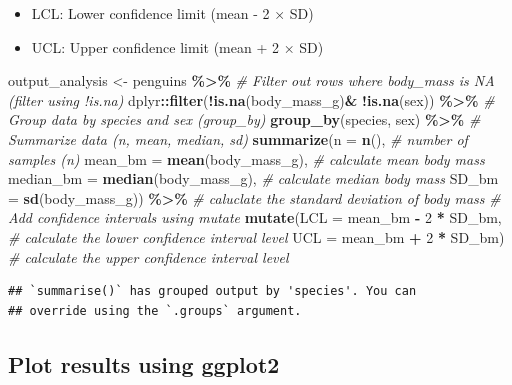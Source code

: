 \documentclass[
]{book}
\newenvironment{Shaded}{\begin{snugshade}}{\end{snugshade}}
\newcommand{\AttributeTok}[1]{\textcolor[rgb]{0.13,0.29,0.53}{#1}}
\newcommand{\CommentTok}[1]{\textcolor[rgb]{0.56,0.35,0.01}{\textit{#1}}}
\newcommand{\DecValTok}[1]{\textcolor[rgb]{0.00,0.00,0.81}{#1}}
\newcommand{\FunctionTok}[1]{\textcolor[rgb]{0.13,0.29,0.53}{\textbf{#1}}}
\newcommand{\NormalTok}[1]{#1}
\newcommand{\OtherTok}[1]{\textcolor[rgb]{0.56,0.35,0.01}{#1}}
\newcommand{\SpecialCharTok}[1]{\textcolor[rgb]{0.81,0.36,0.00}{\textbf{#1}}}
\providecommand{\tightlist}{%
  \setlength{\itemsep}{0pt}\setlength{\parskip}{0pt}}
\begin{document}
\begin{itemize}
\tightlist
\item
  LCL: Lower confidence limit (mean - 2 × SD)
\item
  UCL: Upper confidence limit (mean + 2 × SD)
\end{itemize}

\begin{Shaded}
\begin{Highlighting}[]
\NormalTok{output\_analysis }\OtherTok{\textless{}{-}}\NormalTok{ penguins }\SpecialCharTok{\%\textgreater{}\%}
  \CommentTok{\# Filter out rows where body\_mass is NA (filter using !is.na)}
\NormalTok{  dplyr}\SpecialCharTok{::}\FunctionTok{filter}\NormalTok{(}\SpecialCharTok{!}\FunctionTok{is.na}\NormalTok{(body\_mass\_g)}\SpecialCharTok{\&} \SpecialCharTok{!}\FunctionTok{is.na}\NormalTok{(sex)) }\SpecialCharTok{\%\textgreater{}\%}
  \CommentTok{\# Group data by species and sex (group\_by)}
  \FunctionTok{group\_by}\NormalTok{(species, sex) }\SpecialCharTok{\%\textgreater{}\%}
  \CommentTok{\# Summarize data (n, mean, median, sd)}
  \FunctionTok{summarize}\NormalTok{(}\AttributeTok{n =} \FunctionTok{n}\NormalTok{(), }\CommentTok{\# number of samples (n)}
            \AttributeTok{mean\_bm =} \FunctionTok{mean}\NormalTok{(body\_mass\_g), }\CommentTok{\# calculate mean body mass}
            \AttributeTok{median\_bm =} \FunctionTok{median}\NormalTok{(body\_mass\_g), }\CommentTok{\# calculate median body mass}
            \AttributeTok{SD\_bm =} \FunctionTok{sd}\NormalTok{(body\_mass\_g)) }\SpecialCharTok{\%\textgreater{}\%} \CommentTok{\# caluclate the standard deviation of body mass}
  \CommentTok{\# Add confidence intervals using mutate}
  \FunctionTok{mutate}\NormalTok{(}\AttributeTok{LCL =}\NormalTok{ mean\_bm }\SpecialCharTok{{-}} \DecValTok{2} \SpecialCharTok{*}\NormalTok{ SD\_bm, }\CommentTok{\# calculate the lower confidence interval level}
         \AttributeTok{UCL =}\NormalTok{ mean\_bm }\SpecialCharTok{+} \DecValTok{2} \SpecialCharTok{*}\NormalTok{ SD\_bm) }\CommentTok{\# calculate the upper confidence interval level}
\end{Highlighting}
\end{Shaded}

\begin{verbatim}
## `summarise()` has grouped output by 'species'. You can
## override using the `.groups` argument.
\end{verbatim}

\subsection{Plot results using ggplot2}\label{plot-results-using-ggplot2}
\end{document}
